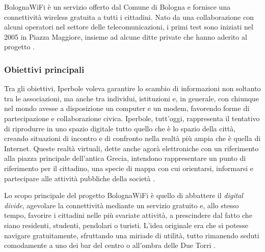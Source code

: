 BolognaWiFi è un servizio offerto dal Comune di Bologna e fornisce una connettività wireless gratuita a tutti i cittadini. Nato da una collaborazione con alcuni operatori nel settore delle telecomunicazioni, i primi test sono iniziati nel 2005 in Piazza Maggiore, insieme ad alcune ditte private che hanno aderito al progetto \cite{Bologna_WiFi_Bluetooth}.

\subsubsection{Obiettivi principali}
Tra gli obiettivi, Iperbole voleva garantire lo scambio di informazioni non soltanto tra le associazioni, ma anche tra individui, istituzioni e, in generale, con chiunque nel mondo avesse a disposizione un computer e un modem, favorendo forme di partecipazione e collaborazione civica.
Iperbole, tutt'oggi, rappresenta il tentativo di riprodurre in uno spazio digitale tutto quello che è lo spazio della città, creando situazioni di incontro e di confronto nella realtà più ampia che è quella di Internet. Queste realtà virtuali, dette anche agorà elettroniche con un riferimento alla piazza principale dell'antica Grecia, intendono rappresentare un punto di riferimento per il cittadino, una specie di mappa con cui orientarsi, informarsi e partecipare alle attività pubbliche della società \cite{Iperbole_Citta_Connessa}.


Lo scopo principale del progetto BolognaWiFi è quello di abbattere il \textit{digital divide}, agevolare la connettività mediante un servizio gratuito e, allo stesso tempo, favorire i cittadini nelle più svariate attività, a prescindere dal fatto che siano residenti, studenti, pendolari o turisti. L'idea originale era che si potesse navigare gratuitamente, sfruttando una miriade di utilità, tutto rimanendo seduti comodamente a uno dei bar del centro o all'ombra delle Due Torri \cite{Bologna_WiFi_Bluetooth}.


